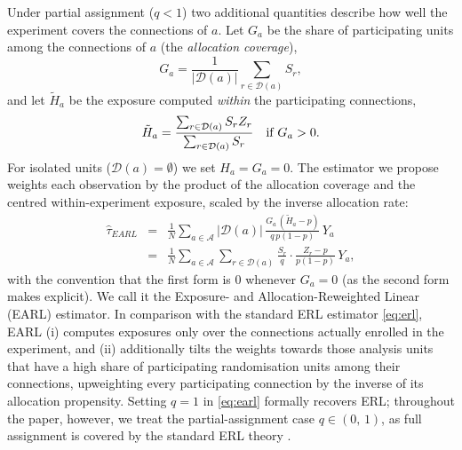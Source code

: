 \documentclass[sigconf]{acmart}
\begin{document}
Under partial assignment ($q<1$) two additional quantities describe how well the experiment covers the connections of $a$. Let $G_a$ be the share of participating units among the connections of $a$ (the \emph{allocation coverage}),
\begin{equation}\label{eq:Ga}
    G_a = \frac{1}{|\mathcal{D}(a)|}\sum_{r\in\mathcal{D}(a)} S_r,
\end{equation}
and let $\tilde H_a$ be the exposure computed \emph{within} the participating connections,
\begin{equation}\label{eq:Hta}
    \tilde H_a = \frac{\sum_{r\in\mathcal{D}(a)} S_rZ_r}{\sum_{r\in\mathcal{D}(a)} S_r}\quad\textup{if } G_a>0.
\end{equation}
For isolated units ($\mathcal D(a)=\emptyset$) we set $H_a = G_a = 0$.
The estimator we propose weights each observation by the product of the allocation coverage and the centred within-experiment exposure, scaled by the inverse allocation rate:
\begin{eqnarray}\label{eq:earl}
    \hat \tau_{EARL} &=& \frac 1 N \sum_{a\in \mathcal A} |\mathcal D(a)|\,\frac{G_a\,(\tilde H_a - p)}{q\,p(1-p)}\, Y_a \nonumber\\
    &=& \frac 1 N \sum_{a\in \mathcal A} \sum_{r\in\mathcal{D}(a)}\frac{S_r}{q}\cdot\frac{Z_r - p}{p(1-p)}\, Y_a,
\end{eqnarray}
with the convention that the first form is $0$ whenever $G_a=0$ (as the second form makes explicit). We call it the Exposure- and Allocation-Reweighted Linear (EARL) estimator. In comparison with the standard ERL estimator \eqref{eq:erl}, EARL (i) computes exposures only over the connections actually enrolled in the experiment, and (ii) additionally tilts the weights towards those analysis units that have a high share of participating randomisation units among their connections, upweighting every participating connection by the inverse of its allocation propensity. Setting $q=1$ in \eqref{eq:earl} formally recovers ERL; throughout the paper, however, we treat the partial-assignment case $q\in(0,\,1)$, as full assignment is covered by the standard ERL theory \cite{harshaw2023erl}.
\end{document}
